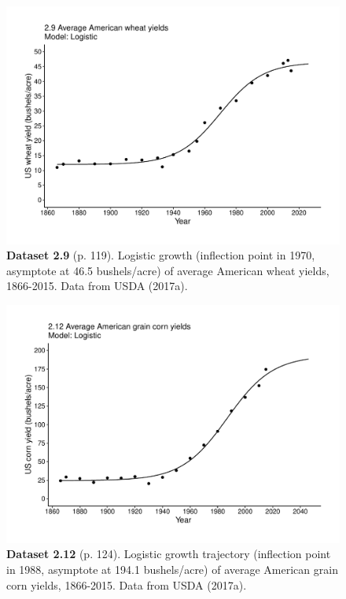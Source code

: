 \documentclass[aps,rmp,preprint,superscriptaddress,10pt,onecolumn]{article}
\begin{document}
\clearpage
\begin{figure}[h]
\includegraphics[width=\textwidth]{output/figs-ggplot/2.9.pdf}
\caption*{\textbf{Dataset 2.9} (p. 119). Logistic growth (inflection point in 1970, asymptote at 46.5 bushels/acre) of average American wheat yields, 1866-2015. Data from USDA (2017a).}
\end{figure}
	
\clearpage
\begin{figure}[h]
\includegraphics[width=\textwidth]{output/figs-ggplot/2.12.pdf}
\caption*{\textbf{Dataset 2.12} (p. 124). Logistic growth trajectory (inflection point in 1988, asymptote at 194.1 bushels/acre) of average American grain corn yields, 1866-2015. Data from USDA (2017a).}
\end{figure}
	
\end{document}
